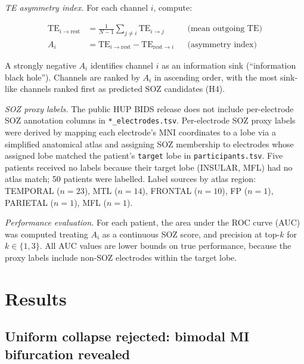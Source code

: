 \documentclass[a4paper,fleqn]{cas-dc}
\begin{document}
\textit{TE asymmetry index.}
For each channel $i$, compute:

\begin{align}
  \mathrm{TE}_{i \to \mathrm{rest}}
    &= \frac{1}{N-1} \sum_{j \neq i} \mathrm{TE}_{i \to j}
    &&\text{(mean outgoing TE)} \\[4pt]
  A_i
    &= \mathrm{TE}_{i \to \mathrm{rest}}
       - \mathrm{TE}_{\mathrm{rest} \to i}
    &&\text{(asymmetry index)}
\end{align}

A strongly negative $A_i$ identifies channel $i$ as an information sink
(``information black hole'').
%
Channels are ranked by $A_i$ in ascending order, with the most
sink-like channels ranked first as predicted SOZ candidates (H4).

\begin{sloppypar}
\textit{SOZ proxy labels.}
The public HUP BIDS release does not include per-electrode SOZ
annotation columns in \texttt{*\_electrodes.tsv}.
%
Per-electrode SOZ proxy labels were derived by mapping each electrode's
MNI coordinates to a lobe via a simplified anatomical atlas and
assigning SOZ membership to electrodes whose assigned lobe matched the
patient's \texttt{target} lobe in \texttt{participants.tsv}.
%
Five patients received no labels because their target lobe (INSULAR,
MFL) had no atlas match; 50 patients were labelled.
%
Label sources by atlas region: TEMPORAL ($n = 23$), MTL ($n = 14$),
FRONTAL ($n = 10$), FP ($n = 1$), PARIETAL ($n = 1$), MFL ($n = 1$).
\end{sloppypar}

\textit{Performance evaluation.}
For each patient, the area under the ROC curve (AUC) was computed
treating $A_i$ as a continuous SOZ score, and precision at top-$k$
for $k \in \{1, 3\}$.
%
All AUC values are lower bounds on true performance, because the proxy
labels include non-SOZ electrodes within the target lobe.

\section{Results}
\label{sec:results}

\subsection{Uniform collapse rejected: bimodal MI bifurcation revealed}
\end{document}
